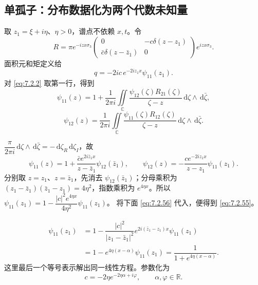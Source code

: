 \documentclass[lang=cn,scheme=chinese,mode=simple,device=normal,color=blue,math=cm,thmcnt=section,12pt]{elegantbook}
\newcommand{\dd}{\,\mathrm{d}}
\newcommand{\eqq}[2]{\tag{#1}\label{eq:#1}#2}
\begin{document}
\subsection{单孤子：分布数据化为两个代数未知量}
取 $z_1=\xi+i\eta$、$\eta>0$，谱点不依赖 $x,t$。令
\begin{equation}
\eqq{7.2.51}{R=\pi e^{-izx\sigma_3}
\begin{pmatrix}0&-c\delta(z-z_1)\\\bar c\delta(z-\bar z_1)&0\end{pmatrix}e^{izx\sigma_3}.}
\end{equation}
面积元和矩定义给
\begin{equation}
\eqq{7.2.52}{q=-2ic\,e^{-2iz_1x}\psi_{11}(z_1).}
\end{equation}
对 \eqref{eq:7.2.2} 取第一行，得到
\begin{equation}
\eqq{7.2.53}{\psi_{11}(z)=1+\dfrac{1}{2\pi i}\iint\limits_{\mathbb C}\dfrac{\psi_{12}(\zeta)R_{21}(\zeta)}{\zeta-z}\dd\zeta\wedge\dd\bar\zeta,}
\end{equation}
\begin{equation}
\eqq{7.2.54}{\psi_{12}(z)=\dfrac{1}{2\pi i}\iint\limits_{\mathbb C}\dfrac{\psi_{11}(\zeta)R_{12}(\zeta)}{\zeta-z}\dd\zeta\wedge\dd\bar\zeta.}
\end{equation}
\begin{callout}
$\dfrac{\pi}{2\pi i}\dd\zeta\wedge\dd\bar\zeta=-\dd\zeta_R\dd\zeta_I$，故
\[
\psi_{11}(z)=1+\dfrac{\bar c e^{2i\bar z_1x}}{z-\bar z_1}\psi_{12}(\bar z_1),\qquad
\psi_{12}(z)=-\dfrac{ce^{-2iz_1x}}{z-z_1}\psi_{11}(z_1).
\]
分别取 $z=z_1$、$z=\bar z_1$，先消去 $\psi_{12}(\bar z_1)$；分母乘积为
$(z_1-\bar z_1)(\bar z_1-z_1)=4\eta^2$，指数乘积为 $e^{4\eta x}$。所以
$\psi_{11}(z_1)=1-\dfrac{|c|^2e^{4\eta x}}{4\eta^2}\psi_{11}(z_1)$。
将下面 \eqref{eq:7.2.56} 代入，便得到 \eqref{eq:7.2.55}。
\end{callout}
\begin{equation}
\eqq{7.2.55}{\begin{aligned}
\psi_{11}(z_1)&=1-\dfrac{|c|^2}{|z_1-\bar z_1|^2}e^{2i(\bar z_1-z_1)x}\psi_{11}(z_1)\\
&=1-e^{4\eta(x-\alpha)}\psi_{11}(z_1)=\dfrac{1}{1+e^{4\eta(x-\alpha)}}.
\end{aligned}}
\end{equation}
这里最后一个等号表示解出同一线性方程。参数化为
\begin{equation}
\eqq{7.2.56}{c=-2\eta e^{-2\eta\alpha+i\varphi},\qquad \alpha,\varphi\in\mathbb R.}
\end{equation}
\end{document}
